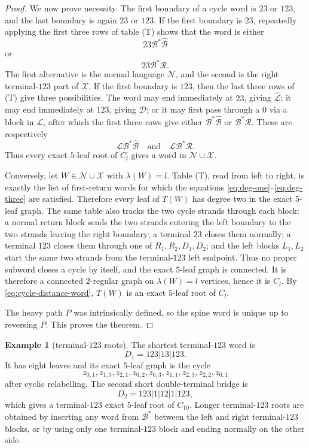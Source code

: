 \documentclass[11pt]{article}
\theoremstyle{definition}
\newtheorem{example}[theorem]{Example}
\begin{document}
\begin{proof}
We now prove necessity.  The first boundary of a cycle word is $23$ or $123$, and the last boundary is again $23$ or $123$.  If the first boundary is $23$, repeatedly applying the first three rows of table (T) shows that the word is either
\[
 23\mathcal B^{*}\widehat{\mathcal B}
\]
or
\[
 23\mathcal B^{*}\mathcal R.
\]
The first alternative is the normal language $\mathcal N$, and the second is the right terminal-$123$ part of $\mathcal X$.  If the first boundary is $123$, then the last three rows of (T) give three possibilities.  The word may end immediately at $23$, giving $\widehat{\mathcal L}$; it may end immediately at $123$, giving $\mathcal D$; or it may first pass through a $0$ via a block in $\mathcal L$, after which the first three rows give either $\mathcal B^{*}\widehat{\mathcal B}$ or $\mathcal B^{*}\mathcal R$.  These are respectively
\[
 \mathcal L\mathcal B^{*}\widehat{\mathcal B}
 \quad\text{and}\quad
 \mathcal L\mathcal B^{*}\mathcal R.
\]
Thus every exact $5$-leaf root of $C_l$ gives a word in $\mathcal N\cup\mathcal X$.

Conversely, let $W\in\mathcal N\cup\mathcal X$ with $\lambda(W)=l$.  Table (T), read from left to right, is exactly the list of first-return words for which the equations \eqref{eq:deg-one}--\eqref{eq:deg-three} are satisfied.  Therefore every leaf of $T(W)$ has degree two in the exact $5$-leaf graph.  The same table also tracks the two cycle strands through each block: a normal return block sends the two strands entering the left boundary to the two strands leaving the right boundary; a terminal $23$ closes them normally; a terminal $123$ closes them through one of $R_1,R_2,D_1,D_2$; and the left blocks $L_1,L_2$ start the same two strands from the terminal-$123$ left endpoint.  Thus no proper subword closes a cycle by itself, and the exact $5$-leaf graph is connected.  It is therefore a connected $2$-regular graph on $\lambda(W)=l$ vertices, hence it is $C_l$.  By \eqref{eq:cycle-distance-word}, $T(W)$ is an exact $5$-leaf root of $C_l$.

The heavy path $P$ was intrinsically defined, so the spine word is unique up to reversing $P$.  This proves the theorem.
\end{proof}

\begin{example}[terminal-$123$ roots]
The shortest terminal-$123$ word is
\[
 D_1=123|13|123.
\]
It has eight leaves and its exact $5$-leaf graph is the cycle
\[
 z_{0,1},z_{1,3},z_{2,1},z_{0,2},z_{0,3},z_{1,1},z_{2,3},z_{2,2},z_{0,1}
\]
after cyclic relabelling.  The second short double-terminal bridge is
\[
 D_2=123|1|12|1|123,
\]
which gives a terminal-$123$ exact $5$-leaf root of $C_{10}$.  Longer terminal-$123$ roots are obtained by inserting any word from $\mathcal B^{*}$ between the left and right terminal-$123$ blocks, or by using only one terminal-$123$ block and ending normally on the other side.
\end{example}
\end{document}
